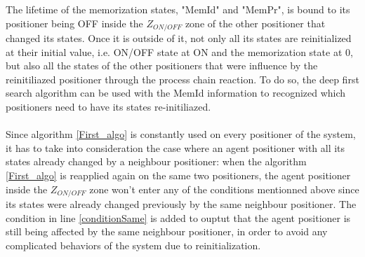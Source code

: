 \documentclass[]{spie}  %
\begin{document}
	 The lifetime of the memorization states, "MemId" and "MemPr", is bound to its positioner being OFF inside the $Z_{ON/OFF}$ zone of the other positioner that changed its states. Once it is outside of it, not only all its states are reinitialized at their initial value, i.e. ON/OFF state at ON and the memorization state at 0, but also all the states of the other positioners that were influence by the reinitiliazed positioner through the process chain reaction. To do so, the deep first search algorithm can be used with the MemId information to recognized which positioners need to have its states re-initiliazed.\\\\
	 Since algorithm \ref{First_algo} is constantly used on every positioner of the system, it has to take into consideration the case where an agent positioner with all its states already changed by a neighbour positioner: when the algorithm \ref{First_algo} is reapplied again on the same two positioners, the agent positioner inside the $Z_{ON/OFF}$ zone won't enter any of the conditions mentionned above since its states were already changed previously by the same neighbour positioner. The condition in line \ref{conditionSame} is added to ouptut that the agent positioner is still being affected by the same neighbour positioner, in order to avoid any complicated behaviors of the system due to reinitialization.  

	
\end{document}
